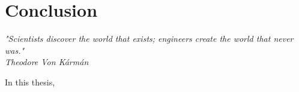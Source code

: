 \chapter{Conclusion}
\label{sec:Conclusion}

{
\begin{flushright}
\small
\textit{"Scientists discover the world that exists; engineers create the world that never was."} \\ 
\emph{Theodore Von Kármán}
\end{flushright}
}
\vspace{+10pt}





In this thesis,

